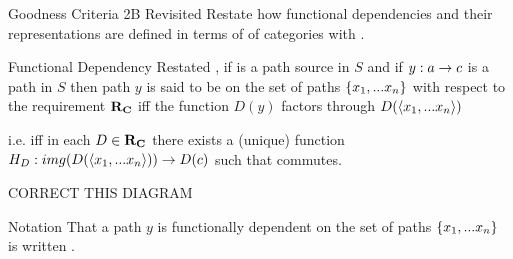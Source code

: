 \begin{frame}{Goodness Criteria 2B Revisited}
Restate how functional dependencies and their representations are defined in terms of  of categories with \thirdstructure.
\end{frame}

\begin{frame}{Functional Dependency Restated}
\IfSforproductepimonoCwithRCwords, 
if  is a path source in $S$ and if
$y: a \rightarrow c$ is a path in $S$
then path $y$ is said to be  on the set of paths $\left\{x_1,...x_n\right\}$ with respect to the requirement $\textbf{R}_{\textbf{C}}$
iff the function $D(y)$ factors through $D(\langle x_1,... x_n \rangle)$

i.e. iff in each $D \in \textbf{R}_{\textbf{C}}$ there exists a  (unique)
function $H_D: img(D(\langle x_1,... x_n \rangle)) \rightarrow D(c)$ 
such that 
 commutes.
\end{frame}
\begin{frame} 
CORRECT THIS DIAGRAM
\end{frame}

\begin{frame}{Notation}
That a path  $y$ is functionally dependent on the set of paths $\left\{x_1,...x_n\right\}$ 
is written  .
\end{frame}

